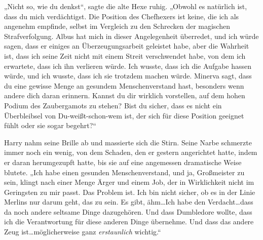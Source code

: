 „Nicht so, wie du denkst“, sagte die alte Hexe ruhig. „Obwohl es natürlich ist, dass du mich verdächtigst. Die Position des Chefhexers ist keine, die ich als angenehm empfinde, selbst im Vergleich zu den Schrecken der magischen Strafverfolgung. Albus hat mich in dieser Angelegenheit überredet, und ich würde sagen, dass er einiges an Überzeugungsarbeit geleistet habe, aber die Wahrheit ist, dass ich seine Zeit nicht mit einem Streit verschwendet habe, von dem ich erwartete, dass ich ihn verlieren würde. Ich wusste, dass ich die Aufgabe hassen würde, und ich wusste, dass ich sie trotzdem machen würde. Minerva sagt, dass du eine gewisse Menge an gesundem Menschenverstand hast, besonders wenn andere dich daran erinnern. Kannst du dir wirklich vorstellen, auf dem hohen Podium des Zaubergamots zu stehen? Bist du sicher, dass es nicht ein Überbleibsel von Du-weißt-schon-wem ist, der sich für diese Position geeignet fühlt oder sie sogar begehrt?“

Harry nahm seine Brille ab und massierte sich die Stirn. Seine Narbe schmerzte immer noch ein wenig, von dem Schaden, den er gestern angerichtet hatte, indem er daran herumgezupft hatte, bis sie auf eine angemessen dramatische Weise blutete.
„Ich habe einen gesunden Menschenverstand, und ja, Großmeister zu sein, klingt nach einer Menge Ärger und einem Job, der in Wirklichkeit nicht im Geringsten zu mir passt. Das Problem ist. Ich bin nicht sicher, ob es in der Linie Merlins nur darum geht, das zu sein. Es gibt, ähm…Ich habe den Verdacht…dass da noch andere seltsame Dinge dazugehören. Und dass Dumbledore wollte, dass ich die Verantwortung für diese anderen Dinge übernehme. Und dass das andere Zeug ist…möglicherweise ganz \emph{erstaunlich} wichtig.“

